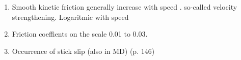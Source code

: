 \begin{enumerate}
  \item Smooth kinetic friction generally increase with speed  \cite{Manini_2016}. so-called velocity strengthening.  Logaritmic with speed %
  \item Friction coeffients on the scale 0.01 to 0.03. 
  \item Occurrence of stick slip (also in MD) \cite{kim_nano-scale_2009} (p. 146)
\end{enumerate}






